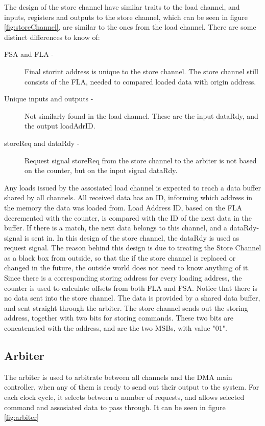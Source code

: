 \begin{appendix}
The design of the store channel have similar traits to the load channel, and inputs, registers and outputs to the store channel, which can be seen in figure \ref{fig:storeChannel}, are similar to the ones from the load channel.
There are some distinct differences to know of:
\begin{description}
    \item[FSA and FLA -]
    Final storint address is unique to the store channel.
    The store channel still consists of the FLA, needed to compared loaded data with origin address.
    \item[Unique inputs and outputs -]
    Not similarly found in the load channel.
    These are the input dataRdy, and the output loadAdrID.
    \item[storeReq and dataRdy -]
    Request signal storeReq from the store channel to the arbiter is not based on the counter, but on the input signal dataRdy.
\end{description}

Any loads issued by the assosiated load channel is expected to reach a data buffer shared by all channels.
All received data has an ID, informing which address in the memory the data was loaded from.
Load Address ID, based on the FLA decremented with the counter, is compared with the ID of the next data in the buffer.
If there is a match, the next data belongs to this channel, and a dataRdy-signal is sent in.
In this design of the store channel, the dataRdy is used as request signal.
The reason behind this design is due to treating the Store Channel as a black box from outside, so that the if the store channel is replaced or changed in the future, the outside world does not need to know anything of it.
Since there is a corresponding storing address for every loading address, the counter is used to calculate offsets from both FLA and FSA.
Notice that there is no data sent into the store channel.
The data is provided by a shared data buffer, and sent straight through the arbiter.
The store channel sends out the storing address, together with two bits for storing commands.
These two bits are concatenated with the address, and are the two MSBs, with value "01".

\subsection{Arbiter}
The arbiter is used to arbitrate between all channels and the DMA main controller, when any of them is ready to send out their output to the system.
For each clock cycle, it selects between a number of requests, and allows selected command and assosiated data to pass through.
It can be seen in figure \ref{fig:arbiter}


\end{appendix}
